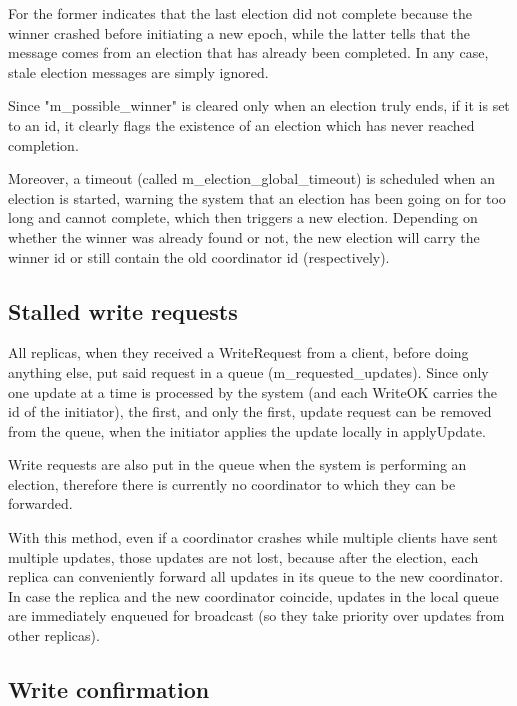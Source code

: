 For the former indicates that the last election did not complete because the winner crashed before initiating a new epoch, while the latter tells that the message comes from an election that has already been completed. In any case, stale election messages are simply ignored.

Since "m\_possible\_winner" is cleared only when an election truly ends, if it is set to an id, it clearly flags the existence of an election which has never reached completion.

Moreover, a timeout (called m\_election\_global\_timeout) is scheduled when an election is started, warning the system that an election has been going on for too long and cannot complete, which then triggers a new election. Depending on whether the winner was already found or not, the new election will carry the winner id or still contain the old coordinator id (respectively).

\subsection{Stalled write requests}

All replicas, when they received a WriteRequest from a client, before doing anything else, put said request in a queue (m\_requested\_updates). Since only one update at a time is processed by the system (and each WriteOK carries the id of the initiator), the first, and only the first, update request can be removed from the queue, when the initiator applies the update locally in applyUpdate. 

Write requests are also put in the queue when the system is performing an election, therefore there is currently no coordinator to which they can be forwarded. 

With this method, even if a coordinator crashes while multiple clients have sent multiple updates, those updates are not lost, because after the election, each replica can conveniently forward all updates in its queue to the new coordinator. In case the replica and the new coordinator coincide, updates in the local queue are immediately enqueued for broadcast (so they take priority over updates from other replicas).

\subsection{Write confirmation}
\label{sec:write-confirmation}

